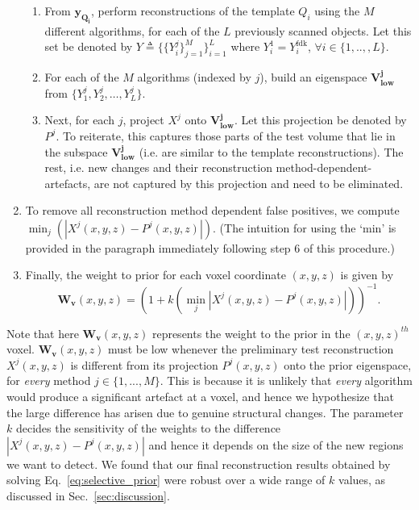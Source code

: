 \documentclass[journal]{IEEEtran}
\begin{document}
\begin{enumerate}
\begin{enumerate}
  \item From $\boldsymbol{y_{Q_i}}$, perform reconstructions of the template $Q_i$ using the $M$ different algorithms, for each of the $L$ previously scanned objects. Let this set be denoted by $Y \triangleq \{\{Y_{i}^j\}_{j=1}^M\}_{i=1}^L$ where $Y^{1}_i = Y^{\text{fdk}}_i$, $\forall i \in \{1,..,,L\}$.


  \item For each of the $M$ algorithms (indexed by $j$), build an eigenspace $\boldsymbol{V_\text{low}^j}$ from $\{Y_1^j,Y_2^j, \ldots, Y_{L}^j\}$. %

  \item Next, for each $j$,  project $X^j$  onto $\boldsymbol{V_\text{low}^j}$. Let this projection be denoted by $P^j$. To reiterate, this captures those parts of the test volume that lie in the subspace $\boldsymbol{V_\text{low}^j}$ (i.e. are similar to the template reconstructions). The rest, i.e. new changes and their reconstruction method-dependent-artefacts, are not captured by this projection and need to be eliminated.
  \end{enumerate}
\item To remove all reconstruction method dependent false positives, we compute $\min_{j}(|X^j(x,y,z) - P^j(x,y,z)|)$. (The intuition for using the `min' is provided in the paragraph immediately following step 6 of this procedure.)
\item Finally, the weight to prior for each voxel coordinate $(x,y,z)$ is given by
  \begin{equation} 
    \boldsymbol{W_v}(x,y,z) = (1+k(\min_{j}|X^j(x,y,z) - P^j(x,y,z)|))^{-1}.
  \end{equation}
\label{eq:weightsEq}
\end{enumerate}
\vspace{0.01mm}
Note that here $\boldsymbol{W_v}(x,y,z)$ represents the weight to the prior in the $(x,y,z)^{th}$ voxel. $\boldsymbol{W_v}(x,y,z)$ must be
low whenever the preliminary test reconstruction $X^j(x,y,z)$ is different from its projection $P^j(x,y,z)$ onto the prior eigenspace, for \emph{every} method $j \in \{1,...,M\}$. This is
because it is unlikely that \emph{every} algorithm would produce a significant artefact at a voxel, and hence we hypothesize that the large difference has arisen due to genuine structural changes. The parameter $k$ decides the sensitivity of the weights to the difference $|X^j(x,y,z) - P^j(x,y,z)|$ and hence it depends on the size of the new regions we want to detect.  
We found that our final reconstruction results obtained by
solving Eq.~\ref{eq:selective_prior} were robust over a wide range of $k$ values, as discussed in Sec.~\ref{sec:discussion}.
\end{document}
